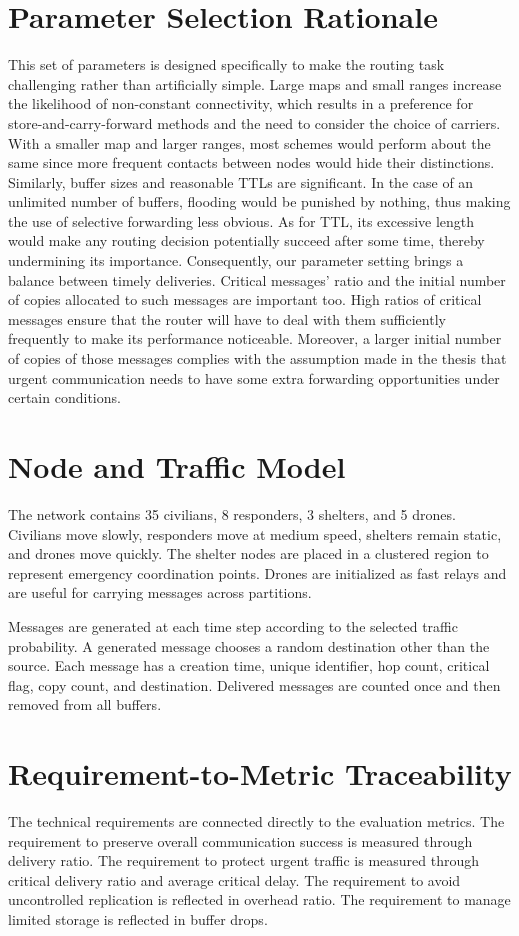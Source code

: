 \section{Parameter Selection Rationale}
This set of parameters is designed specifically to make the routing task challenging rather than artificially simple. Large maps and small ranges increase the likelihood of non-constant connectivity, which results in a preference for store-and-carry-forward methods and the need to consider the choice of carriers. With a smaller map and larger ranges, most schemes would perform about the same since more frequent contacts between nodes would hide their distinctions.
Similarly, buffer sizes and reasonable TTLs are significant. In the case of an unlimited number of buffers, flooding would be punished by nothing, thus making the use of selective forwarding less obvious. As for TTL, its excessive length would make any routing decision potentially succeed after some time, thereby undermining its importance. Consequently, our parameter setting brings a balance between timely deliveries.
Critical messages' ratio and the initial number of copies allocated to such messages are important too. High ratios of critical messages ensure that the router will have to deal with them sufficiently frequently to make its performance noticeable. Moreover, a larger initial number of copies of those messages complies with the assumption made in the thesis that urgent communication needs to have some extra forwarding opportunities under certain conditions.

\section{Node and Traffic Model}
The network contains 35 civilians, 8 responders, 3 shelters, and 5 drones. Civilians move slowly, responders move at medium speed, shelters remain static, and drones move quickly. The shelter nodes are placed in a clustered region to represent emergency coordination points. Drones are initialized as fast relays and are useful for carrying messages across partitions.

Messages are generated at each time step according to the selected traffic probability. A generated message chooses a random destination other than the source. Each message has a creation time, unique identifier, hop count, critical flag, copy count, and destination. Delivered messages are counted once and then removed from all buffers.

\section{Requirement-to-Metric Traceability}
The technical requirements are connected directly to the evaluation metrics. The requirement to preserve overall communication success is measured through delivery ratio. The requirement to protect urgent traffic is measured through critical delivery ratio and average critical delay. The requirement to avoid uncontrolled replication is reflected in overhead ratio. The requirement to manage limited storage is reflected in buffer drops.

